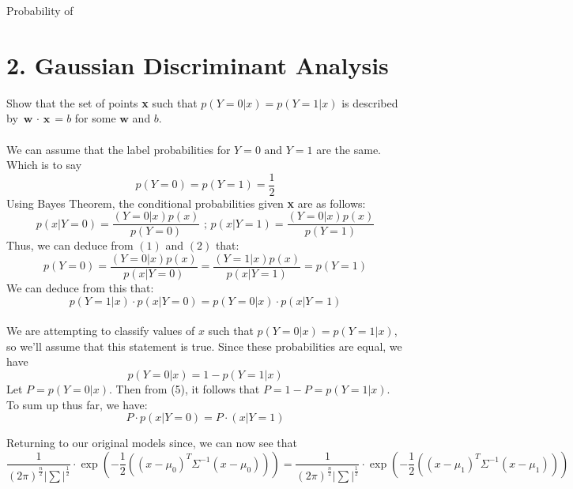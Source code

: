 \documentclass[11pt]{article}
\begin{document}
\noindent Probability of 

\section*{2. Gaussian Discriminant Analysis}
Show that the set of points \textbf{x} such that $p(Y = 0 | x) = p(Y = 1 | x )$ is described by $\textbf{w $\cdot$ x} = b$ for some $\textbf{w}$ and $b$.\\ \\
We can assume that the label probabilities for $Y = 0 \text{ and } Y = 1$ are the same. Which is to say
\begin{equation}p(Y = 0) = p(Y = 1) = \frac{1}{2}\end{equation}
Using Bayes Theorem, the conditional probabilities given \textbf{x} are as follows:
\begin{equation}p(x | Y = 0) = \frac{(Y = 0 | x)p(x)}{p(Y = 0)} \text{ ;   } p(x | Y = 1) = \frac{(Y = 0 | x)p(x)}{p(Y = 1)}\end{equation}
Thus, we can deduce from $(1)$ and $(2)$ that:
\begin{equation}p(Y = 0) = \frac{(Y = 0 | x)p(x)}{p(x | Y = 0)} = \frac{(Y = 1 | x)p(x)}{p(x | Y = 1)} = p(Y=1)\end{equation}
We can deduce from this that:
\begin{equation}p(Y = 1 | x) \cdot p(x | Y=0) = p(Y = 0 | x) \cdot p(x | Y=1)\end{equation}
\\
We are attempting to classify values of $x$ such that $p(Y = 0 | x) = p(Y = 1 | x)$, so we'll assume that this statement is true.
Since these probabilities are equal, we have 
\begin{equation}p(Y = 0 | x) = 1 - p(Y = 1 | x)\end{equation}
Let $P = p(Y = 0|x)$. Then from (5), it follows that $P = 1 - P = p(Y = 1 | x)$.\\
To sum up thus far, we have:
\begin{equation}P \cdot p(x | Y = 0) =  P \cdot (x | Y = 1)\end{equation}

Returning to our original models since, we can now see that
\begin{equation}
\frac{1}{(2\pi) ^ \frac{n}{2}|\sum| ^ \frac{1}{2}} \cdot \exp{(-\frac{1}{2}((x - \mu_0)^T\Sigma^{-1}(x-\mu_0)))} = \frac{1}{(2\pi) ^ \frac{n}{2}|\sum| ^ \frac{1}{2}} \cdot \exp{(-\frac{1}{2}((x - \mu_1)^T\Sigma^{-1}(x-\mu_1)))}
\end{equation}
\end{document}
